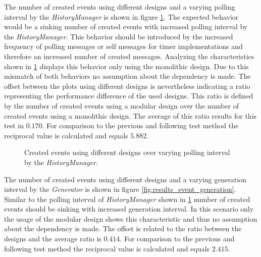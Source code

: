 The number of created events using different designs and a varying polling interval by the \emph{HistoryManager} is shown in figure \ref{fig:results_event_polling}.
The expected behavior would be a sinking number of created events with increased polling interval by the \emph{HistoryManager}.
This behavior should be introduced by the increased frequency of polling messages or self messages for timer implementations and therefore an increased number of created messages.
Analyzing the characteristics shown in \ref{fig:results_event_polling} displays this behavior only using the monolithic design.
Due to this mismatch of both behaviors no assumption about the dependency is made.
The offset between the plots using different designs is nevertheless indicating a ratio representing the performance difference of the used designs.
This ratio is defined by the number of created events using a modular design over the number of created events using a monolithic design.
The average of this ratio results for this test in $0.170$.
For comparison to the previous and following test method the reciprocal value is calculated and equals $5.882$.
\\

\begin{figure}
    \centering
    \caption{Created events using different designs over varying polling interval by the \emph{HistoryManager}.}
    \label{fig:results_event_polling}
\end{figure}

The number of created events using different designs and a varying generation interval by the \emph{Generator} is shown in figure \ref{fig:results_event_generation}.
Similar to the polling interval of \emph{HistoryManager} shown in \ref{fig:results_event_polling} number of created events should be sinking with increased generation interval.
In this scenario only the usage of the modular design shows this characteristic and thus no assumption about the dependency is made.
The offset is related to the ratio between the designs and the average ratio is $0.414$.
For comparison to the previous and following test method the reciprocal value is calculated and equals $2.415$.
\\

